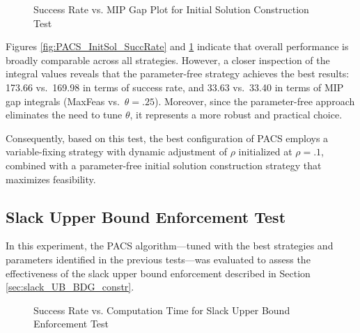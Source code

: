 \begin{figure}[H]
    \centering
    \begin{minipage}{0.6\columnwidth}
        \centering
        \resizebox{\linewidth}{!}{}
    \end{minipage}%
    \hfill
    \begin{minipage}{0.4\columnwidth}
        \centering
        \resizebox{\linewidth}{!}{}
    \end{minipage}
    \caption{Success Rate vs. MIP Gap Plot for Initial Solution Construction Test}
    \label{fig:PACS_InitSol_MGAP}
\end{figure}
Figures \ref{fig:PACS_InitSol_SuccRate} and \ref{fig:PACS_InitSol_MGAP} indicate that overall performance is broadly comparable across all strategies. However, a closer inspection of the integral values reveals that the parameter-free strategy achieves the best results: 173.66 vs.\ 169.98 in terms of success rate, and 33.63 vs.\ 33.40 in terms of MIP gap integrals (MaxFeas vs.\ $\theta=.25$). Moreover, since the parameter-free approach eliminates the need to tune $\theta$, it represents a more robust and practical choice.

Consequently, based on this test, the best configuration of PACS employs a variable-fixing strategy with dynamic adjustment of $\rho$ initialized at $\rho = .1$, combined with a parameter-free initial solution construction strategy that maximizes feasibility.

\subsection{Slack Upper Bound Enforcement Test}\label{sec:test_slack_UB}
In this experiment, the PACS algorithm—tuned with the best strategies and parameters identified in the previous tests—was evaluated to assess the effectiveness of the slack upper bound enforcement described in Section \ref{sec:slack_UB_BDG_constr}.

\begin{figure}[H]
\centering
\begin{minipage}{0.6\columnwidth}
\centering
\resizebox{\linewidth}{!}{}
\end{minipage}%
\hfill
\begin{minipage}{0.4\columnwidth}
\centering
\resizebox{\linewidth}{!}{}
\end{minipage}
\caption{Success Rate vs. Computation Time for Slack Upper Bound Enforcement Test}
\label{fig:PACS_FixSlack_SuccRate}
\end{figure}

